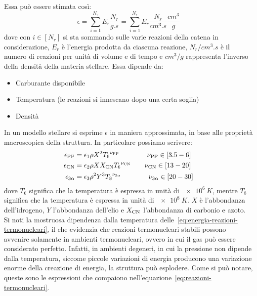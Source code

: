 Essa può essere stimata così:
\begin{equation}
    \epsilon = \sum_{i=1}^{N_r} E_r \dfrac{N_r}{\si{g.s}} = \sum_{i=1}^{N_r} E_r \dfrac{N_r}{\si{cm^3.s}} \dfrac{\si{cm^3}}{\si{g}}
\end{equation}
dove con $i \in [N_r]$ si sta sommando sulle varie reazioni della catena in considerazione, $E_r$ è l'energia prodotta da ciascuna reazione, $N_r/\si{cm^3.s}$ è il numero di reazioni per unità di volume e di tempo e $\si{cm^3} / \si{g}$ rappresenta l'inverso della densità della materia stellare. Essa dipende da:
\begin{itemize}
    \item Carburante disponibile
    \item Temperatura (le reazioni si innescano dopo una certa soglia)
    \item Densità
\end{itemize}

In un modello stellare si esprime $\epsilon$ in maniera approssimata, in base alle proprietà macroscopica della struttura. In particolare possiamo scrivere:
\begin{subequations}
\label{eq:energia-reazioni-termonucleari}
\begin{align}
\epsilon_\textup{PP} &= \epsilon_1 \rho X^2 {T_6}^{\nu_\textup{PP}} \qquad \qquad \nu_\textup{PP} \in [3.5 - 6] \label{eq:energia-PP}\\
\epsilon_\textup{CN} &= \epsilon_2 \rho X X_\textup{CN} {T_6}^{\nu_\textup{CN}} \qquad \nu_\textup{CN} \in [13 - 20] \label{eq:energia-CN}\\
\epsilon_{3\alpha} &= \epsilon_3 \rho^2 Y^3 {T_8}^{\nu_{3\alpha}} \qquad \qquad \nu_{3 \alpha} \in [20 - 30] \label{eq:energia-3A}
\end{align}
\end{subequations}
dove $T_6$ significa che la temperatura è espressa in unità di $\SI{e6}{K}$, mentre $T_8$ significa che la temperatura è espressa in unità di $\SI{e8}{K}$. $X$ è l'abbondanza dell'idrogeno, $Y$ l'abbondanza dell'elio e $X_\textup{CN}$ l'abbondanza di carbonio e azoto. Si noti la mostruosa dipendenza dalla temperatura delle~\eqref{eq:energia-reazioni-termonucleari}, il che evidenzia che reazioni termonucleari stabili possono avvenire solamente in ambienti termonucleari, ovvero in cui il gas può essere considerato perfetto. Infatti, in ambienti degeneri, in cui la pressione non dipende dalla temperatura, siccome piccole variazioni di energia producono una variazione enorme della creazione di energia, la struttura può esplodere. Come si può notare, queste sono le espressioni che compaiono nell'equazione~\eqref{eq:reazioni-termonucleari}. 

